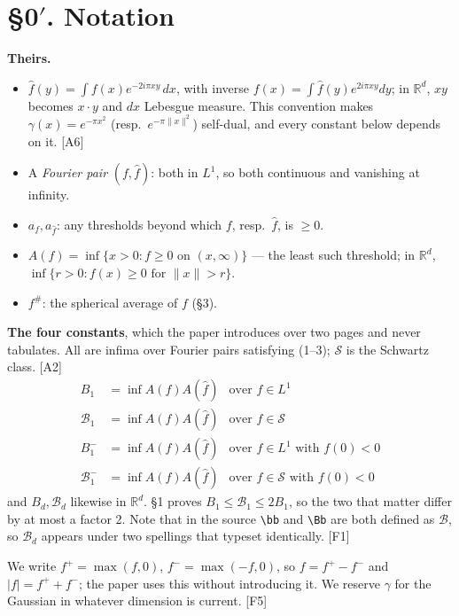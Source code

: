 \documentclass[11pt,reqno]{amsart}
\theoremstyle{plain}
\theoremstyle{definition}
\theoremstyle{remark}
\newcommand{\R}{\mathbb{R}}
\newcommand{\Ss}{\mathcal{S}}
\newcommand{\Bcal}{\mathcal{B}}
\newcommand{\fh}{\widehat{f}}
\newcommand{\Ledger}[1]{{\scriptsize\textsf{[#1]}}}
\begin{document}
\section*{\S0$'$. Notation}

\noindent\textbf{Theirs.}
\begin{itemize}[leftmargin=1.6em,itemsep=1pt]
\item $\fh(y)=\int f(x)e^{-2i\pi xy}\,dx$, with inverse $f(x)=\int\fh(y)e^{2i\pi xy}dy$;
  in $\R^d$, $xy$ becomes $x\cdot y$ and $dx$ Lebesgue measure. This convention makes
  $\gamma(x)=e^{-\pi x^2}$ (resp.\ $e^{-\pi\|x\|^2}$) self-dual, and every constant
  below depends on it. \Ledger{A6}
\item A \emph{Fourier pair} $(f,\fh)$: both in $L^1$, so both continuous and vanishing
  at infinity.
\item $a_f,a_{\fh}$: any thresholds beyond which $f$, resp.\ $\fh$, is $\ge0$.
\item $A(f)=\inf\{x>0: f\ge0 \text{ on } (x,\infty)\}$ --- the least such threshold;
  in $\R^d$, $\inf\{r>0: f(x)\ge0 \text{ for } \|x\|>r\}$.
\item $f^\#$: the spherical average of $f$ (\S3).
\end{itemize}

\begin{ournotation}
\textbf{The four constants}, which the paper introduces over two pages and never
tabulates. All are infima over Fourier pairs satisfying (1--3); $\Ss$ is the Schwartz
class. \Ledger{A2}
\[
\begin{array}{lll}
 B_1 &=\inf A(f)A(\fh) & \text{over } f\in L^1\\
 \Bcal_1 &=\inf A(f)A(\fh) & \text{over } f\in\Ss\\
 B_1^- &=\inf A(f)A(\fh) & \text{over } f\in L^1 \text{ with } f(0)<0\\
 \Bcal_1^- &=\inf A(f)A(\fh) & \text{over } f\in\Ss \text{ with } f(0)<0
\end{array}
\]
and $B_d,\Bcal_d$ likewise in $\R^d$. \S1 proves $B_1\le\Bcal_1\le2B_1$, so the two
that matter differ by at most a factor 2. Note that in the source \verb|\bb| and
\verb|\Bb| are both defined as $\mathcal B$, so $\Bcal_d$ appears under two spellings
that typeset identically. \Ledger{F1}
\end{ournotation}

\begin{ournotation}
We write $f^+=\max(f,0)$, $f^-=\max(-f,0)$, so $f=f^+-f^-$ and $|f|=f^++f^-$; the
paper uses this without introducing it. We reserve $\gamma$ for the Gaussian in
whatever dimension is current. \Ledger{F5}
\end{ournotation}
\end{document}
